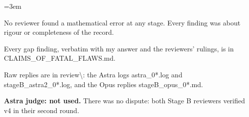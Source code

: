 \documentclass[11pt]{report}
\newenvironment{mdblock}{\begingroup\mdfont\raggedright\setlength{\parindent}{0pt}\setlength{\parskip}{0.55em}\emergencystretch=3em}{\par\endgroup}
\begin{document}
\begin{mdblock}
\begin{mdbul}
\item No reviewer found a mathematical error at any stage. Every finding was about rigour or completeness of the record.
\item Every gap finding, verbatim with my answer and the reviewers' rulings, is in {\mdtt CLAIMS\_\allowbreak{}OF\_\allowbreak{}FATAL\_\allowbreak{}FLAWS.\allowbreak{}md}.
\item Raw replies are in {\mdtt review\textbackslash{}\allowbreak{}}: the Astra logs {\mdtt astra\_\allowbreak{}0*.\allowbreak{}log} and {\mdtt stageB\_\allowbreak{}astra2\_\allowbreak{}0*.\allowbreak{}log}, and the Opus replies {\mdtt stageB\_\allowbreak{}opus\_\allowbreak{}0*.\allowbreak{}md}.
\item \textbf{Astra judge: not used.} There was no dispute: both Stage B reviewers verified v4 in their second round.
\end{mdbul}
\end{mdblock}
\end{document}
